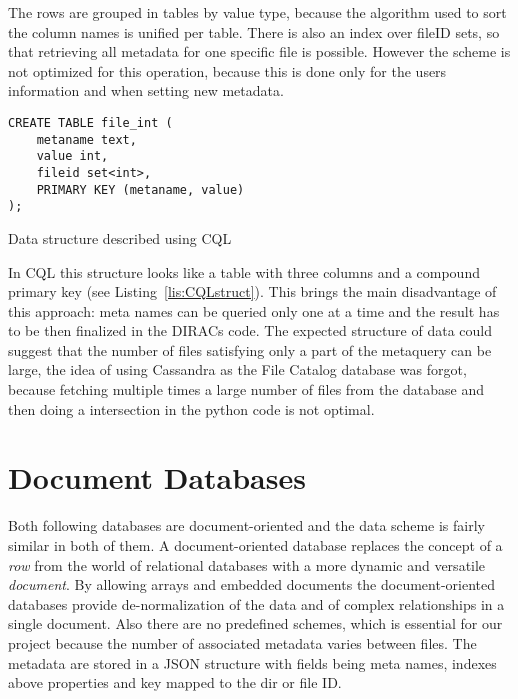 The rows are grouped in tables by value type, because the algorithm used to sort the
column names is unified per table. There is also an index over fileID sets, 
so that retrieving all metadata for one specific file is possible. However the scheme is 
not optimized for this operation, because this is done only for the users information and
when setting new metadata.

\begin{listing}
\begin{verbatim}
CREATE TABLE file_int (
    metaname text,
    value int,
    fileid set<int>,
    PRIMARY KEY (metaname, value)
);
\end{verbatim}
\caption{Data structure described using CQL}
\label{lis:CQLstruct}
\end{listing}

In CQL this structure looks like a table with three columns and a compound primary key (see 
Listing~\ref{lis:CQLstruct}). 
This brings the main disadvantage of this approach: meta names can be queried only one at a time and
the result has to be then finalized in the DIRACs code. The expected structure of data could
suggest that the number of files satisfying only a part of the metaquery can be large, the idea of using 
Cassandra as the File Catalog database was forgot, because fetching multiple times a large number of 
files from the database and then doing a intersection in the python code is not optimal. 



\section{Document Databases}

Both following databases are document-oriented and the data scheme is fairly similar in both
of them. A document-oriented database replaces the concept of a \textit{row} from the world of relational 
databases with a more dynamic and versatile \textit{document}. By allowing arrays and embedded documents the 
document-oriented databases provide de-normalization of the data and of complex 
relationships in a single document. Also there are no predefined schemes, which is essential for our project because 
the number of associated metadata varies between 
files. The metadata are stored in a JSON structure with fields being meta names, indexes above properties and key 
mapped to the dir or file ID.



